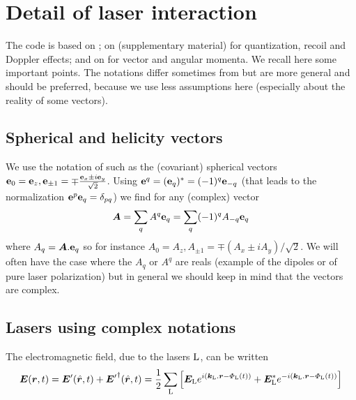 \documentclass[amsmath,amssymb,nofootinbib]{revtex4-2}
\begin{document}
	 \newpage
	 
	 \appendix
	 
	  \section{Detail of laser interaction}

The code is based on \cite{comparat2014molecular};  on \cite{chaneliere2018phase} (supplementary material) for quantization, recoil and Doppler effects;  and on
\cite{manual_Steck,varshalovich1988quantum} for vector and angular momenta.
We recall here some important points. The notations differ sometimes from  \cite{comparat2014molecular}  but are more general  and should be preferred, because we use less assumptions here (especially about the reality of some vectors).
	 	 
	 	  	 
	 	 \subsection{Spherical  and helicity vectors }
	 	 
	 	 We  use the notation of \cite{varshalovich1988quantum} such as the (covariant) spherical  vectors 
	 	 $ {\bf e}_0 = {\bf e}_z, {\bf e}_{\pm 1} =  \mp \frac{{\bf e}_x \pm
	 	 	i {\bf e}_y} { \sqrt{2}}$.
	 	 Using ${\bf{e}}^q = ({\bf{e}}_q)^* = (-1)^q {\bf{e}}_{-q}$ (that leads to the normalization ${\bf{e}}^p  {\bf{e}}_q = \delta_{pq} $) we find for any (complex) vector
	 	 $$\bm A = \sum_q A^{q} {\bf{e}}_q  = \sum_q (-1)^q A_{-q} {\bf{e}}_q   $$
	 	 where 
	 	 $A_q = \bm A.
	 	 {\bf{e}}_q$ so for instance $A_0 = A_z, A_{\pm 1} =  \mp (A_x \pm
	 	 i A_y)/\sqrt{2}$.
	 	 We will often have the case where the $A_q$ or $A^q$ are reals (example of the dipoles or of pure laser polarization) but in general we should keep in mind that the vectors are complex.
	 	 
	 	 
	 	 
	 	 \subsection{Lasers using  complex notations}
	 	 
	 	 
	 	 
	 	 
	 	 The electromagnetic field, due to the lasers $\rm L$, can be written
	 	 $${\bm E}(\bm r,t) = 	 {\bm E'}(\hat{\bm r},t)+ {\bm E'}^\dag(\hat{\bm r},t)  = \frac{1}{2}\sum_{\rm L}    \left[ {\bm E}_{\rm L} e^{i(  {\bm k}_{\rm L}. {\bm r} - \Phi_{\rm L}
	 	 	(t))} +  {\bm E}_{\rm L}^\ast e^{-i(  {\bm k}_{\rm L}. {\bm r} - \Phi_{\rm L}
	 	 	(t))}  \right] $$
	 
\end{document}
